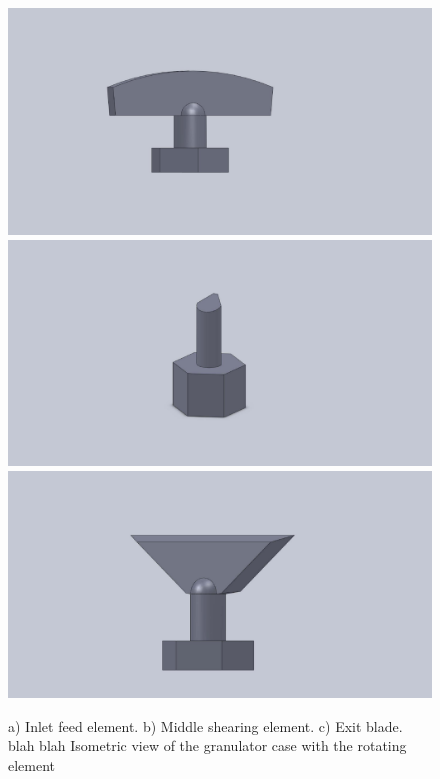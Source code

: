 \documentclass[preprint,11pt,authoryear]{elsarticle}
\begin{document}
	      \begin{figure}[H]
	      \centering
	      \includegraphics[scale=0.075]{feed_element.pdf}
	      \includegraphics[scale=0.075]{shear_element.pdf}
	      \includegraphics[scale=0.075]{exit_element.pdf}
	      \caption{a) Inlet feed element. b) Middle shearing element.  c) Exit blade. blah blah Isometric view of the granulator case with the rotating element }
	      \label{fig:mthds_dem_charles_fig5pt3and4_blades_n_isometric}
	      \end{figure}     
	    
\end{document}
